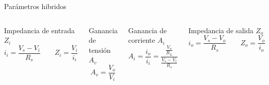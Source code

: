 \begin{frame}{Parámetros hibridos}
    \begin{columns}[t]
      \begin{block}{Impedancia de entrada $Z_i$}
        \[
          i_i = \frac{V_s - V_i}{R_s}
          \qquad
          Z_i = \frac{V_i}{i_i}
        \]
      \end{block}
    
      \begin{block}{Ganancia de tensión $A_v$}
        \[
          A_v = \frac{V_o}{V_i}
        \]
      \end{block}
    
      \begin{block}{Ganancia de corriente $A_i$}
        \[
          A_i = \frac{i_o}{i_i}
          = \frac{\tfrac{V_o}{R_L}}{\tfrac{V_s - V_i}{R_s}}
        \]
      \end{block}
    
      \begin{block}{Impedancia de salida $Z_o$}
        \[
          i_o = \frac{V_s - V_o}{R_s}
          \qquad
          Z_o = \frac{V_o}{i_o}
        \]
      \end{block}
    \end{columns}

\end{frame}





